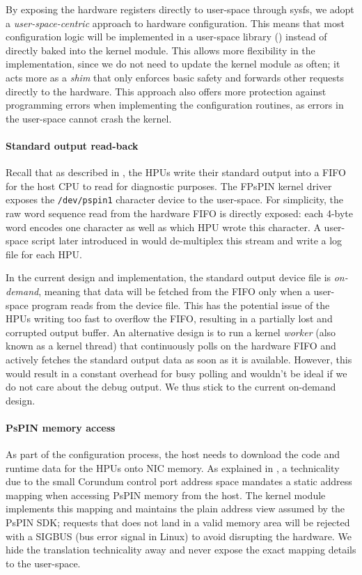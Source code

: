By exposing the hardware registers directly to user-space through sysfs, we adopt a \emph{user-space-centric} approach to hardware configuration.  This means that most configuration logic will be implemented in a user-space library () instead of directly baked into the kernel module.  This allows more flexibility in the implementation, since we do not need to update the kernel module as often; it acts more as a \emph{shim} that only enforces basic safety and forwards other requests directly to the hardware.  This approach also offers more protection against programming errors when implementing the configuration routines, as errors in the user-space cannot crash the kernel.

\paragraph{Standard output read-back} Recall that as described in , the HPUs write their standard output into a FIFO for the host CPU to read for diagnostic purposes.  The FPsPIN kernel driver exposes the \texttt{/dev/pspin1} character device to the user-space.  For simplicity, the raw word sequence read from the hardware FIFO is directly exposed: each 4-byte word encodes one character as well as which HPU wrote this character.  A user-space script later introduced in  would de-multiplex this stream and write a log file for each HPU.

In the current design and implementation, the standard output device file is \emph{on-demand}, meaning that data will be fetched from the FIFO only when a user-space program reads from the device file.  This has the potential issue of the HPUs writing too fast to overflow the FIFO, resulting in a partially lost and corrupted output buffer.  An alternative design is to run a kernel \emph{worker} (also known as a kernel thread) that continuously polls on the hardware FIFO and actively fetches the standard output data as soon as it is available.  However, this would result in a constant overhead for busy polling and wouldn't be ideal if we do not care about the debug output.  We thus stick to the current on-demand design.

\paragraph{PsPIN memory access} As part of the configuration process, the host needs to download the code and runtime data for the HPUs onto NIC memory.  As explained in , a technicality due to the small Corundum control port address space mandates a static address mapping when accessing PsPIN memory from the host.  The kernel module implements this mapping and maintains the plain address view assumed by the PsPIN SDK; requests that does not land in a valid memory area will be rejected with a SIGBUS (bus error signal in Linux) to avoid disrupting the hardware.  We hide the translation technicality away and never expose the exact mapping details to the user-space.

